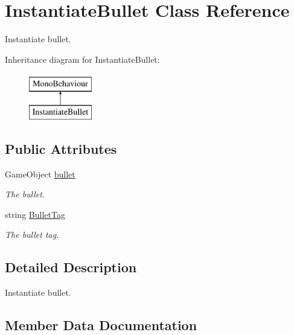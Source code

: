 \hypertarget{class_instantiate_bullet}{}\section{Instantiate\+Bullet Class Reference}
\label{class_instantiate_bullet}


Instantiate bullet.  


Inheritance diagram for Instantiate\+Bullet\+:\begin{figure}[H]
\begin{center}
\leavevmode
\includegraphics[height=2.000000cm]{class_instantiate_bullet}
\end{center}
\end{figure}
\subsection*{Public Attributes}
\begin{DoxyCompactItemize}
\item 
Game\+Object \mbox{\hyperlink{class_instantiate_bullet_a5f592b6ea8184022a425de7fb34cd1c8}{bullet}}
\begin{DoxyCompactList}\small\item\em The bullet. \end{DoxyCompactList}\item 
string \mbox{\hyperlink{class_instantiate_bullet_a3eebc503e154a693e632bf480b2209c4}{Bullet\+Tag}}
\begin{DoxyCompactList}\small\item\em The bullet tag. \end{DoxyCompactList}\end{DoxyCompactItemize}


\subsection{Detailed Description}
Instantiate bullet. 



\subsection{Member Data Documentation}
\mbox{\label{class_instantiate_bullet_a5f592b6ea8184022a425de7fb34cd1c8}} 
